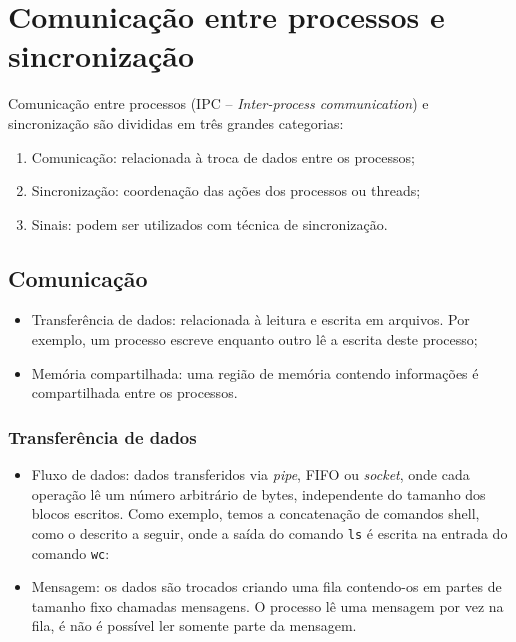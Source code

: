 
\chapter*{Comunicação entre processos e sincronização}

Comunicação entre processos (IPC -- {\it Inter-process communication})
e sincronização são divididas em três grandes categorias:

\begin{enumerate}

\item Comunicação: relacionada à troca de dados entre os processos;
\item Sincronização: coordenação das ações dos processos ou threads;
\item Sinais: podem ser utilizados com técnica de sincronização.

\end{enumerate}

\section*{Comunicação}

\begin{itemize}
\item Transferência de dados: relacionada à leitura e escrita em
  arquivos. Por exemplo, um processo escreve enquanto outro lê a
  escrita deste processo;

\item Memória compartilhada: uma região de memória contendo
  informações é compartilhada entre os processos.
  
\end{itemize}

\subsection*{Transferência de dados}

\begin{itemize}

\item Fluxo de dados: dados transferidos via {\it pipe}, FIFO ou {\it
  socket}, onde cada operação lê um número arbitrário de bytes,
  independente do tamanho dos blocos escritos. Como exemplo, temos a
  concatenação de comandos shell, como o descrito a seguir, onde a
  saída do comando {\tt ls} é escrita na entrada do comando {\tt wc}:




\item Mensagem: os dados são trocados criando uma fila contendo-os
  em partes de tamanho fixo chamadas mensagens. O processo lê uma
  mensagem por vez na fila, é não é possível ler somente parte da
  mensagem.



\end{itemize}

